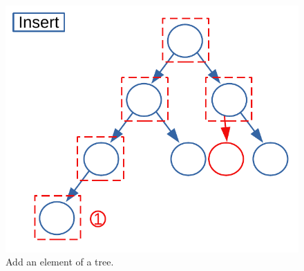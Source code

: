 \begin{figure}[H]
	\begin{center}
		\includegraphics[scale=.6]{chapters/trees/images/trees_10.pdf}
		\caption[Add an element of a tree.]{Add an element of a tree.}
		\label{trees_10}
	\end{center}
\end{figure}

